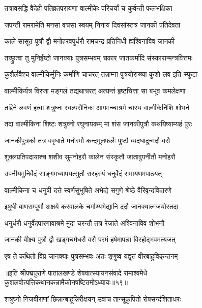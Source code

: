 \twolineshloka
{तत्रावसद्धि वैदेही पतिव्रतपरायणा}
{वाल्मीकेः परिचर्यां च कुर्वन्ती फलभक्षिका}%

\twolineshloka
{जपन्ती रामरामेति मनसा वचसा स्वयम्}
{निनाय दिवसांस्तत्र जानकी पतिदेवता}%

\twolineshloka
{काले सासूत पूत्रौ द्वौ मनोहरवपुर्धरौ}
{रामचन्द्र प्रतिनिधी ह्यश्विनाविव जानकी}%

\twolineshloka
{तच्छ्रुत्वा तु मुनिर्हृष्टो जानक्याः पुत्रसम्भवम्}
{चकार जातकर्मादि संस्कारान्मन्त्रवित्तमः}%

\twolineshloka
{कुशैर्लवैश्च वाल्मीकिर्मुनिः कर्माणि चाचरत्}
{तन्नाम्ना पुत्रयोराख्या कुशो लव इति स्फुटा}%

\twolineshloka
{वाल्मीकिर्यत्र विरजा मङ्गलं तद्यथाचरत्}
{अत्यन्तं हृष्टचित्ता सा बभूव कमलेक्षणा}%

\twolineshloka
{तद्दिने लवणं हत्वा शत्रुघ्नः स्वल्पसैनिकः}
{आगमच्चाश्रमे चास्य वाल्मीकेर्निशि शोभने}%

\twolineshloka
{तदा वाल्मीकिना शिष्टः शत्रुघ्नो रघुनायकम्}
{मा शंस जानकीपुत्रौ कथयिष्याम्यहं पुरः}%

\twolineshloka
{जानकीपुत्रकौ तत्र ववृधाते मनोरमौ}
{कन्दमूलफलैः पुष्टौ व्यदधादुन्मदौ वरौ}%

\twolineshloka
{शुक्लप्रतिपदायाश्च शशीव सुमनोहरौ}
{कालेन संस्कृतौ जातावुपनीतौ मनोहरौ}%

\twolineshloka
{उपनीयमुनिर्वेदं साङ्गमध्यापयत्सुतौ}
{सरहस्यं धनुर्वेदं रामायणमपाठयत्}%

\twolineshloka
{वाल्मीकिना च धनुषी दत्ते स्वर्णसुभूषिते}
{अभेद्ये सगुणे श्रेष्ठे वैरिवृन्दविदारणे}%

\twolineshloka
{इषुधी बाणसम्पूर्णौ अक्षये करवालके}
{चर्माण्यभेद्यानि ददौ जानक्यात्मजयोस्तदा}%

\twolineshloka
{धनुर्धरौ धनुर्वेदपारगावाश्रमे मुदा}
{चरन्तौ तत्र रेजाते अश्विनाविव शोभनौ}%

\twolineshloka
{जानकी वीक्ष्य पुत्रौ द्वौ खड्गचर्मधरौ वरौ}
{परमं हर्षमापन्ना विरहोद्भवमत्यजत्}%

\twolineshloka
{एष ते कथितो विप्र जानक्याः पुत्रसम्भवः}
{अतः शृणुष्व यद्वृत्तं वीरबाहुविकृन्तनम्}%

{॥इति श्रीपद्मपुराणे पातालखण्डे शेषवात्स्यायनसंवादे रामाश्वमेधे कुशलवोत्पत्तिकथानकन्नामैकोनषष्टितमोऽध्यायः॥५९॥}



\twolineshloka
{शत्रुघ्नो निजवीराणां छिन्नान्बाहून्निरीक्षयन्}
{उवाच तान्सुकुपितो रोषसन्दंशिताधरः}%

